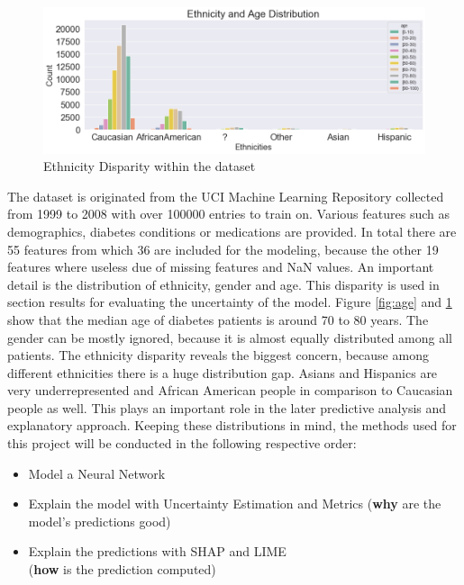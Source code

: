 \documentclass[journal]{IEEEtran}
\begin{document}
\begin{figure}
	\centering
	\includegraphics[width=1\linewidth]{../imgs/ethnicities_new}
	\caption{Ethnicity Disparity within the dataset}
	\label{fig:eth}
\end{figure}

\noindent The dataset is originated from the UCI Machine Learning Repository \cite{uci} collected from 1999 to 2008 with over 100000 entries to train on. Various features such as demographics, diabetes conditions or medications are provided. In total there are 55 features from which 36 are included for the modeling, because the other 19 features where useless due of missing features and NaN values. An important detail is the distribution of ethnicity, gender and age. This disparity is used in section results for evaluating the uncertainty of the model. Figure \ref{fig:age} and \ref{fig:eth} show that the median age of diabetes patients is around 70 to 80 years. The gender can be mostly ignored, because it is almost equally distributed among all patients. The ethnicity disparity reveals the biggest concern, because among different ethnicities there is a huge distribution gap. Asians and Hispanics are very underrepresented and African American people in comparison to Caucasian people as well. This plays an important role in the later predictive analysis and explanatory approach. Keeping these distributions in mind, the methods used for this project will be conducted in the following respective order:  

\begin{itemize}
	\item Model a Neural Network 
	\item Explain the model with Uncertainty Estimation and Metrics (\textbf{why} are the model's predictions good)
	\item Explain the predictions with SHAP and LIME \\ (\textbf{how} is the prediction computed) \\
\end{itemize}
\end{document}
